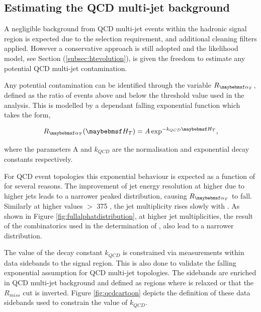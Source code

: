 \subsection{Estimating the QCD multi-jet background}
\label{subsec:qcdbackground}

A negligible background from QCD multi-jet events within the hadronic signal region is expected due to the selection requirement, and additional cleaning filters applied. However a conservative approach is still adopted and the likelihood model, see Section (\ref{subsec:htevolution}), is given the freedom to estimate any potential QCD multi-jet contamination. 

Any potential contamination can be identified through the variable $R_{\alphat}$, defined as the ratio of events above and below the \alphat threshold value used in the analysis. This is modelled by a \theht dependant falling exponential function which takes the form,

\begin{equation}
\label{eq:qcdmodel}
R_{\alphat}(\theht) =  A \exp^{-k_{QCD}\theht},
\end{equation}

where the parameters A and $k_{QCD}$ are the normalisation and exponential decay constants respectively. 

For QCD event topologies this exponential behaviour is expected as a function of \theht for several reasons. The improvement of jet energy resolution at higher \theht due to higher \pt jets leads to a narrower peaked distribution, causing $R_{\alphat}$ to fall. Similarly at higher \theht values $>$ 375 \GeV, the jet multiplicity rises slowly with \theht. As shown in Figure \ref{fig:fullalphatdistribution}, at higher jet multiplicities, the result of the combinatorics used in the determination of \alphat, also lead to a narrower \alphat distribution. 

The value of the decay constant $k_{QCD}$ is constrained via measurements within data sidebands to the signal region. This is also done to validate the falling exponential assumption for QCD multi-jet topologies. The sidebands are enriched in QCD multi-jet background and defined as regions where \alphat is relaxed or that the $R_{miss}$ cut is inverted. Figure \ref{fig:qcdcartoon} depicts the definition of these data sidebands used to constrain the value of $k_{QCD}$.

